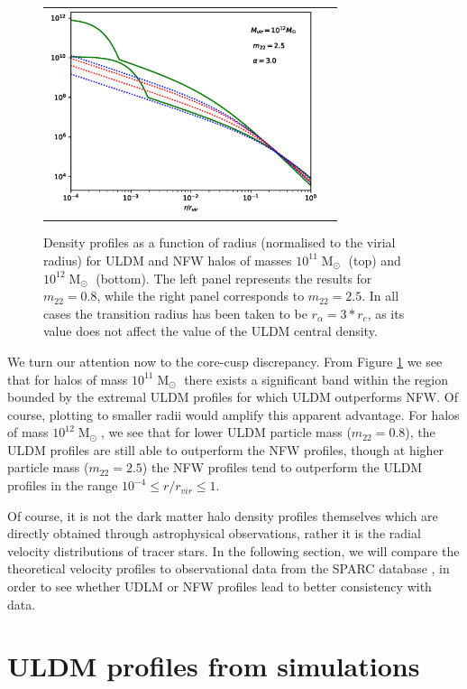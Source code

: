 \documentclass[a4paper,11pt]{article}
\begin{document}
\begin{figure}
\begin{tabular}{cc}
{\includegraphics[width = 3.1in, trim={2.1cm 0.5cm 0cm 0.5cm}]{pics/12_25_3.eps}}
\end{tabular}
\caption{Density profiles as a function of radius (normalised to the virial radius) for ULDM and NFW halos of masses $10^{11}\operatorname{M}_{\odot}$ (top) and $10^{12}\operatorname{M}_{\odot}$ (bottom). The left panel represents the results for $m_{22} = 0.8$, while the right panel corresponds to $m_{22}=2.5$. In all cases the transition radius has been taken to be $r_{\alpha} = 3*r_c$, as its value does not affect the value of the ULDM central density.}\label{fig:profiles}
\end{figure}


We turn our attention now to the core-cusp discrepancy. From Figure \ref{fig:profiles} we see that for halos of mass $10^{11}\operatorname{M}_{\odot}$ there exists a significant band within the region bounded by the extremal ULDM profiles for which ULDM outperforms NFW.  Of course, plotting to smaller radii would amplify this apparent advantage. For halos of mass $10^{12}\operatorname{M}_{\odot}$, we see that for lower ULDM particle mass ($m_{22}=0.8$), the ULDM profiles are still able to outperform the NFW profiles, though at higher particle mass ($m_{22}=2.5$) the  NFW profiles tend to outperform the ULDM profiles in the range $10^{-4}\leq r/r_{vir} \leq 1$.

Of course, it is not the dark matter halo density profiles themselves which are directly obtained through astrophysical observations, rather it is the radial velocity distributions of tracer stars. In the following section, we will compare the theoretical velocity profiles to observational data from the SPARC database \cite{Lelli:2016zqa}, in order to see whether UDLM or NFW profiles lead to better consistency with data. 

\section{ULDM profiles from simulations}
\end{document}
